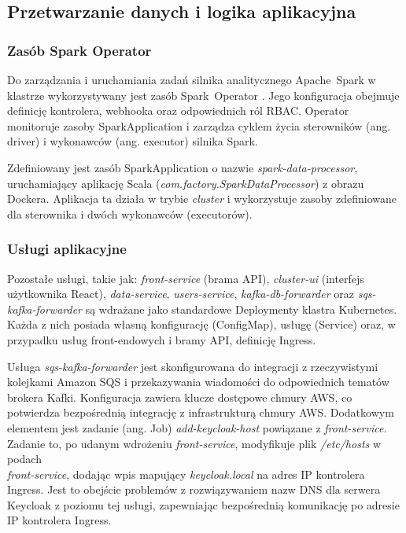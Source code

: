 \subsection{Przetwarzanie danych i logika aplikacyjna}

\subsubsection{Zasób Spark Operator}
Do zarządzania i uruchamiania zadań silnika analitycznego \mbox{Apache Spark} w klastrze wykorzystywany jest zasób \mbox{Spark Operator} \cite{spark_operator_docs}. Jego konfiguracja obejmuje definicję kontrolera, webhooka oraz odpowiednich ról RBAC. Operator monitoruje zasoby \mbox{SparkApplication} i zarządza cyklem życia sterowników (ang. driver) i wykonawców (ang. executor) silnika Spark.

Zdefiniowany jest zasób SparkApplication o nazwie \textit{spark-data-processor}, uruchamiający aplikację Scala (\textit{com.factory.SparkDataProcessor}) z obrazu Dockera. Aplikacja ta działa w trybie \textit{cluster} i wykorzystuje zasoby zdefiniowane dla sterownika i dwóch wykonawców (executorów).

\subsubsection{Usługi aplikacyjne}
Pozostałe usługi, takie jak: \textit{front-service} (brama API), \textit{cluster-ui} (interfejs użytkownika React), \textit{data-service}, \textit{users-service}, \textit{kafka-db-forwarder} oraz \textit{sqs-kafka-forwarder} są wdrażane jako standardowe Deploymenty klastra Kubernetes. Każda z nich posiada własną konfigurację (ConfigMap), usługę (Service) oraz, w przypadku usług front-endowych i bramy API, definicję Ingress.

Usługa \textit{sqs-kafka-forwarder} jest skonfigurowana do integracji z rzeczywistymi kolejkami Amazon SQS \cite{sqs_docs} i przekazywania wiadomości do odpowiednich tematów brokera Kafki. Konfiguracja zawiera klucze dostępowe chmury AWS, co potwierdza bezpośrednią integrację z infrastrukturą chmury AWS.
\newpage
Dodatkowym elementem jest zadanie (ang. Job) \textit{add-keycloak-host} powiązane z \textit{front-service}. Zadanie to, po udanym wdrożeniu \textit{front-service}, modyfikuje plik \textit{/etc/hosts} w podach \\ \textit{front-service}, dodając wpis mapujący \textit{keycloak.local} na adres IP kontrolera Ingress. Jest to obejście problemów z rozwiązywaniem nazw DNS dla serwera Keycloak z poziomu tej usługi, zapewniając bezpośrednią komunikację po adresie IP kontrolera Ingress.

